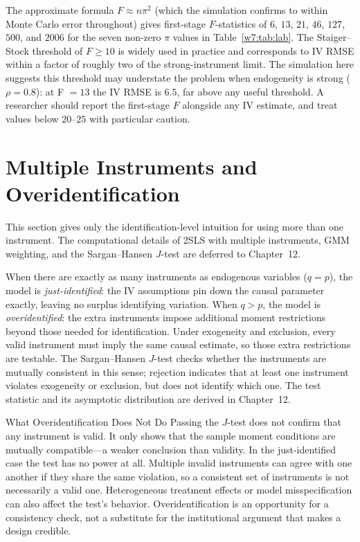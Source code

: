 \documentclass[master.tex]{subfiles}
\begin{document}
\begin{remark}
\label{w7:rem:fstat}
The approximate formula $F \approx n\pi^2$ (which the simulation
confirms to within Monte Carlo error throughout) gives
first-stage $F$-statistics of $6$, $13$, $21$, $46$, $127$,
$500$, and $2006$ for the seven non-zero $\pi$ values in
Table~\ref{w7:tab:lab}.  The Staiger--Stock threshold of $F \geq 10$
\citep{bound1995problems} is widely used in practice and
corresponds to IV RMSE within a factor of roughly two of the
strong-instrument limit.  The simulation here suggests this
threshold may understate the problem when endogeneity is strong
($\rho = 0.8$): at F $= 13$ the IV RMSE is $6.5$, far
above any useful threshold.  A researcher should report the
first-stage $F$ alongside any IV estimate, and treat values
below $20$--$25$ with particular caution.
\end{remark}

\section{Multiple Instruments and Overidentification}
\label{w7:sec:overid}

This section gives only the identification-level intuition for using
more than one instrument.  The computational details of 2SLS with
multiple instruments, GMM weighting, and the Sargan--Hansen $J$-test
are deferred to Chapter~12.

When there are exactly as many instruments as endogenous variables
($q = p$), the model is \emph{just-identified}: the IV assumptions
pin down the causal parameter exactly, leaving no surplus
identifying variation.  When $q > p$, the model is
\emph{overidentified}: the extra instruments impose additional
moment restrictions beyond those needed for identification.  Under
exogeneity and exclusion, every valid instrument must imply the
same causal estimate, so those extra restrictions are testable.
The Sargan--Hansen $J$-test \citep{sargan1958estimation,hansen1982large}
checks whether the instruments are mutually consistent in this
sense; rejection indicates that at least one instrument violates
exogeneity or exclusion, but does not identify which one.  The
test statistic and its asymptotic distribution are derived in
Chapter~12.

\begin{warn}{What Overidentification Does Not Do}
Passing the $J$-test does not confirm that any instrument is valid.
It only shows that the sample moment conditions are mutually
compatible---a weaker conclusion than validity.  In the
just-identified case the test has no power at all.  Multiple
invalid instruments can agree with one another if they share the
same violation, so a consistent set of instruments is not
necessarily a valid one.  Heterogeneous treatment effects or
model misspecification can also affect the test's behavior.
Overidentification is an opportunity for a consistency check, not
a substitute for the institutional argument that makes a design
credible.
\end{warn}
\end{document}
